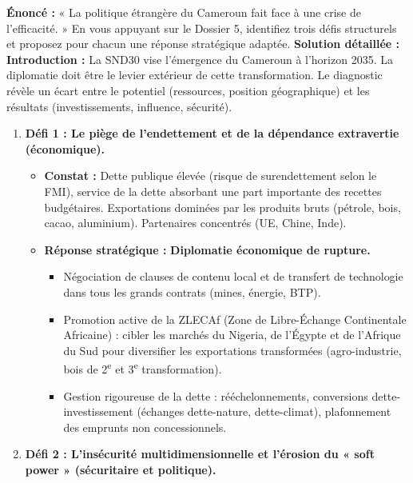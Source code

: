 \documentclass[11pt]{article}
\newcommand{\cle}[1]{{\popxbold\color{popdark}#1}}
\begin{document}
\begin{exoresolu}
    \textbf{Énoncé :} « La politique étrangère du Cameroun fait face à une crise de l'efficacité. » En vous appuyant sur le Dossier 5, identifiez trois défis structurels et proposez pour chacun une réponse stratégique adaptée.
    \tcblower
    \textbf{Solution détaillée :}
    \textbf{Introduction :} La SND30 vise l'émergence du Cameroun à l'horizon 2035. La diplomatie doit être le levier extérieur de cette transformation. Le diagnostic révèle un écart entre le potentiel (ressources, position géographique) et les résultats (investissements, influence, sécurité).
    \begin{enumerate}
        \item \textbf{Défi 1 : Le piège de l'endettement et de la dépendance extravertie (économique).}
            \begin{itemize}
                \item \textbf{Constat :} Dette publique élevée (risque de surendettement selon le FMI), service de la dette absorbant une part importante des recettes budgétaires. Exportations dominées par les produits bruts (pétrole, bois, cacao, aluminium). Partenaires concentrés (UE, Chine, Inde).
                \item \textbf{Réponse stratégique :} \textbf{Diplomatie économique de rupture.}
                    \begin{itemize}
                        \item Négociation de clauses de \cle{contenu local} et de \cle{transfert de technologie} dans tous les grands contrats (mines, énergie, BTP).
                        \item Promotion active de la \cle{ZLECAf} (Zone de Libre-Échange Continentale Africaine) : cibler les marchés du Nigeria, de l'Égypte et de l'Afrique du Sud pour diversifier les exportations transformées (agro-industrie, bois de 2\textsuperscript{e} et 3\textsuperscript{e} transformation).
                        \item Gestion rigoureuse de la dette : \cle{rééchelonnements}, \cle{conversions dette-investissement} (échanges dette-nature, dette-climat), plafonnement des emprunts non concessionnels.
                    \end{itemize}
            \end{itemize}
        \item \textbf{Défi 2 : L'insécurité multidimensionnelle et l'érosion du « soft power » (sécuritaire et politique).}

\end{enumerate}
\end{exoresolu}
\end{document}
